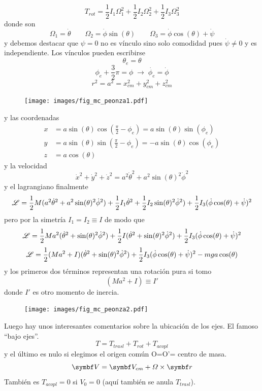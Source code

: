 \documentclass[10pt,oneside]{CBFT_book}
\begin{document}
\[
	T_{rot} = \frac{1}{2} I_1 \Omega^2_ 1 + \frac{1}{2} I_2 \Omega^2_2 + \frac{1}{2} I_3 \Omega^2_3 
\]
donde son 
\[
	\Omega_1 = \dot{\theta} \qquad \Omega_2 = \dot{\phi} \sin(\theta) \qquad \Omega_3 = \dot{\phi} \cos(\theta) + \dot{\psi}
\]
y debemos destacar que $\psi=0$ no es vínculo sino solo comodidad pues $\dot{\psi} \neq 0$ y es independiente.
Los vínculos pueden escribirse
\[
	\theta_e = \theta
\]
\[
	\phi_e + \frac{3}{2}\pi = \phi \; \longrightarrow \; \dot{\phi_e} = \dot{\phi}
\]
\[
	r^2 = a^2 = x_{cm}^2 + y_{cm}^2 + z_{cm}^2
\]
\begin{figure}[htb]
	\begin{center}
	\texttt{[image: images/fig\_mc\_peonza1.pdf]}	 
	\end{center}
	\caption{}
\end{figure} 
y las coordenadas
\begin{align*}
	x &= a \sin(\theta) \cos\left( \frac{\pi}{2}-\phi_e \right) = a \sin(\theta) \sin( \phi_e ) \\
	y &= a \sin(\theta) \sin\left( \frac{\pi}{2}-\phi_e \right) = -a \sin(\theta) \cos( \phi_e ) \\
	z &= a \cos(\theta)
\end{align*}
y la velocidad
\[
	\dot{x}^2 + \dot{y}^2 + \dot{z}^2 = a^2 \dot{\theta}^2 + a^2 \sin(\theta)^2 \dot{\phi}^2
\]
y el lagrangiano finalmente
\[
	\mathscr{L} = \frac{1}{2} M (a^2 \dot{\theta}^2 + a^2 \sin(\theta)^2 \dot{\phi}^2) + \frac{1}{2} I_1 \dot{\theta}^2
	+ \frac{1}{2} I_2 \sin(\theta)^2 \dot{\phi}^2) + \frac{1}{2} I_3 (\dot{\phi} \cos(\theta) + \dot{\psi})^2 
\]
pero por la simetría $I_1=I_2\equiv I$ de modo que 
\[
	\mathscr{L} = \frac{1}{2} M a^2 (\dot{\theta}^2 + \sin(\theta)^2 \dot{\phi}^2) + \frac{1}{2} I ( \dot{\theta}^2 +
	\sin(\theta)^2 \dot{\phi}^2 ) + \frac{1}{2} I_3 (\dot{\phi} \cos(\theta) + \dot{\psi})^2 
\]
\[
	\mathscr{L} = \frac{1}{2} ( M a^2 + I ) (\dot{\theta}^2 + \sin(\theta)^2 \dot{\phi}^2) +  
		\frac{1}{2} I_3 (\dot{\phi} \cos(\theta) + \dot{\psi})^2  - m g a \cos(\theta)
\]
y los primeros dos términos representan una rotación pura si tomo 
\[
	( M a^2 + I ) \equiv I' 
\]
donde $I'$ es otro momento de inercia.
\begin{figure}[htb]
	\begin{center}
	\texttt{[image: images/fig\_mc\_peonza2.pdf]}	 
	\end{center}
	\caption{}
\end{figure} 

Luego hay unos interesantes comentarios sobre la ubicación de los ejes. El famoso ``bajo ejes''.
\[
	T = T_{trasl} + T_{rot} + T_{acopl}
\]
y el último es nulo si elegimos el origen común O=O'= centro de masa.
\[
	\vb{V} = \vb{V}_{cm} + \Omega \times \vb{r}
\]
También es $T_{acopl}=0$ si $V_0=0$ (aquí también se anula $T_{trasl}$).
\end{document}
